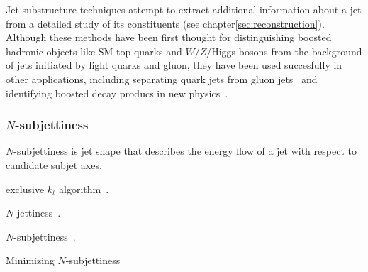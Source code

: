 Jet substructure techniques attempt to extract additional information about a jet from a detailed study of its constituents (see chapter\ref{sec:reconstruction}). Although these methods have been first thought for distinguishing boosted hadronic objects like SM top quarks and $W/Z/$Higgs bosons from the background of jets initiated by light quarks and gluon, they have been used succesfully in other applications, including separating quark jets from gluon jets~\cite{PhysRevLett.107.172001} and identifying boosted decay producs in new physics~\cite{PhysRevD.82.095012}.






\subsubsection{$N$-subjettiness}

$N$-subjettiness is jet shape that describes the energy flow of a jet with respect to candidate subjet axes.  


exclusive $k_t$ algorithm~\cite{exclusivekt}.

$N$-jettiness~\cite{njetti}.

$N$-subjettiness~\cite{nsubjettiness}.

Minimizing $N$-subjettiness~\cite{mininsubjettiness}
